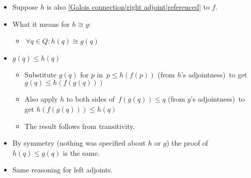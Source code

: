 \begin{itemize}
    \item Suppose $h$ is also \ref{Galois connection|right adjoint|referenced} to $f$.
    \item What it means for $h \cong g$:
          \begin{itemize}
            \item \,$\forall q \in Q:  h(q) \cong g(q)$\,
          \end{itemize}
    \item $g(q) \leq h(q)$
      \begin{itemize}
      \item Substitute $g(q)$ for $p$ in \,$p \leq h(f(p))$ (from $h$'s adjointness)\, to get $g(q) \leq h(f(g(q)))$
      \item Also apply $h$ to both sides of \,$f(g(q)) \leq q$ (from $g$'s adjointness)\, to get $h(f(g(q)))\leq h(q)$
      \item The result follows from transitivity.
      \end{itemize}
    \item By symmetry (nothing was specified about $h$ or $g$) the proof of $h(q)\leq g(q)$ is the same.
    \item Same reasoning for left adjoints.
  \end{itemize}